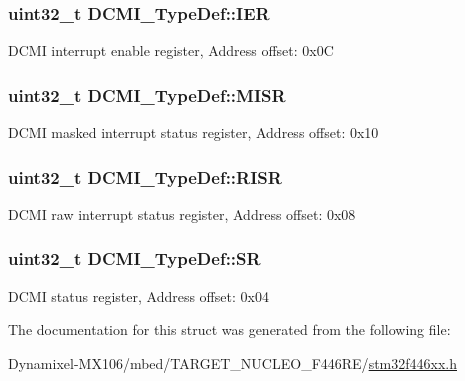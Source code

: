\subsubsection[{\texorpdfstring{I\+ER}{IER}}]{ uint32\+\_\+t D\+C\+M\+I\+\_\+\+Type\+Def\+::\+I\+ER}\hypertarget{struct_d_c_m_i___type_def_a91ce93b57d8382147574c678ee497c63}{}\label{struct_d_c_m_i___type_def_a91ce93b57d8382147574c678ee497c63}
D\+C\+MI interrupt enable register, Address offset\+: 0x0C 
\subsubsection[{\texorpdfstring{M\+I\+SR}{MISR}}]{ uint32\+\_\+t D\+C\+M\+I\+\_\+\+Type\+Def\+::\+M\+I\+SR}\hypertarget{struct_d_c_m_i___type_def_ab367c4ca2e8ac87238692e6d55d622ec}{}\label{struct_d_c_m_i___type_def_ab367c4ca2e8ac87238692e6d55d622ec}
D\+C\+MI masked interrupt status register, Address offset\+: 0x10 
\subsubsection[{\texorpdfstring{R\+I\+SR}{RISR}}]{ uint32\+\_\+t D\+C\+M\+I\+\_\+\+Type\+Def\+::\+R\+I\+SR}\hypertarget{struct_d_c_m_i___type_def_ae0aba9f38498cccbe0186b7813825026}{}\label{struct_d_c_m_i___type_def_ae0aba9f38498cccbe0186b7813825026}
D\+C\+MI raw interrupt status register, Address offset\+: 0x08 
\subsubsection[{\texorpdfstring{SR}{SR}}]{ uint32\+\_\+t D\+C\+M\+I\+\_\+\+Type\+Def\+::\+SR}\hypertarget{struct_d_c_m_i___type_def_a1bbe4b3cc5d9552526bec462b42164d5}{}\label{struct_d_c_m_i___type_def_a1bbe4b3cc5d9552526bec462b42164d5}
D\+C\+MI status register, Address offset\+: 0x04 

The documentation for this struct was generated from the following file\+:\begin{DoxyCompactItemize}
\item 
Dynamixel-\/\+M\+X106/mbed/\+T\+A\+R\+G\+E\+T\+\_\+\+N\+U\+C\+L\+E\+O\+\_\+\+F446\+R\+E/\hyperlink{stm32f446xx_8h}{stm32f446xx.\+h}\end{DoxyCompactItemize}
